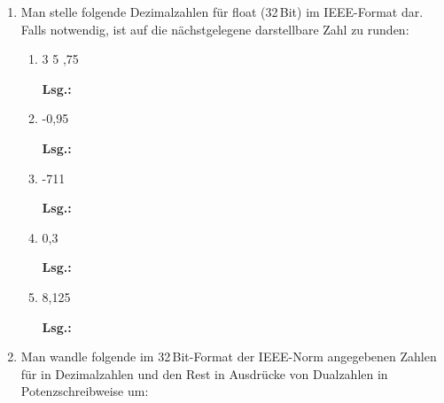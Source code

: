 \documentclass[12pt,a4paper]{scrreprt}
\newcommand{\Lsg}{\par \textbf{Lsg.: }}
\newcommand{\Bit}{\,Bit}
\begin{document}
\begin{enumerate}
\begin{enumerate}
\Lsg%

\item -33 + 64

\Lsg%

\item 33 - 64

\Lsg%

\end{enumerate}

\item Man stelle folgende Dezimalzahlen für float (\si{32}{\Bit}) im IEEE-Format dar. Falls notwendig, ist auf die nächstgelegene darstellbare Zahl zu runden:

\begin{enumerate}
\item 3 5 ,75

\Lsg%

\item -0,95

\Lsg%

\item -711

\Lsg%

\item 0,3

\Lsg%

\item 8,125

\Lsg%

\end{enumerate}

\item Man wandle folgende im \si{32}{\Bit}-Format der IEEE-Norm angegebenen Zahlen für in Dezimalzahlen und den Rest in Ausdrücke von Dualzahlen in Potenzschreibweise um:


\end{enumerate}
\end{document}
